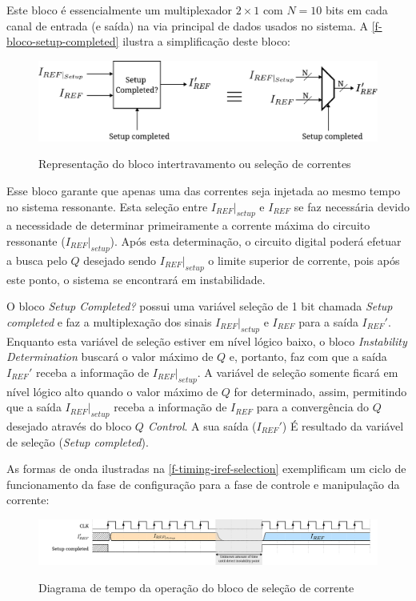 Este bloco é essencialmente um multiplexador $2\times 1$ com $N = 10$ bits em cada canal de entrada (e saída) na via principal de dados usados no sistema. A \autoref{f-bloco-setup-completed} ilustra a simplificação deste bloco:

\begin{figure}[H]
    \centering
    \caption{Representação do bloco intertravamento ou seleção de correntes}
    \includegraphics[width=.9\textwidth]{fig/setup-completed-equiv.pdf}
    \label{f-bloco-setup-completed}
\end{figure}

Esse bloco garante que apenas uma das correntes seja injetada ao mesmo tempo no sistema ressonante. Esta seleção entre $I_{REF}|_{setup}$ e $I_{REF}$ se faz necessária devido a necessidade de determinar primeiramente a corrente máxima do circuito ressonante ($I_{REF}|_{setup}$). Após esta determinação, o circuito digital poderá efetuar a busca pelo $Q$ desejado sendo $I_{REF}|_{setup}$ o limite superior de corrente, pois após este ponto, o sistema se encontrará em instabilidade.


O bloco \textit{Setup Completed?} possui uma variável seleção de 1 bit chamada \textit{Setup completed} e faz a multiplexação dos sinais $I_{REF}|_{setup}$ e $I_{REF}$ para a saída $I_{REF}'$. Enquanto esta variável de seleção estiver em nível lógico baixo, o bloco \textit{Instability Determination} buscará o valor máximo de $Q$ e, portanto, faz com que a saída $I_{REF}'$ receba a informação de $I_{REF}|_{setup}$. A variável de seleção somente ficará em nível lógico alto quando o valor máximo de $Q$ for determinado, assim, permitindo que a saída $I_{REF}|_{setup}$ receba a informação de $I_{REF}$ para a convergência do $Q$ desejado através do bloco \textit{$Q$ Control}. A sua saída ($I_{REF}'$) É resultado da variável de seleção (\textit{Setup completed}).

As formas de onda ilustradas na \autoref{f-timing-iref-selection} exemplificam um ciclo de funcionamento da fase de configuração para a fase de controle e manipulação da corrente:%

\begin{figure}[H]
    \centering
    \caption{Diagrama de tempo da operação do bloco de seleção de corrente}
    \includegraphics{fig/timing-iref-selection.pdf}
    \label{f-timing-iref-selection}
\end{figure}

